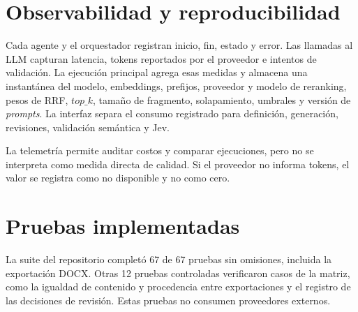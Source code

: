 \section{Observabilidad y reproducibilidad}

Cada agente y el orquestador registran inicio, fin, estado y error. Las llamadas al LLM capturan latencia, tokens reportados por el proveedor e intentos de validación. La ejecución principal agrega esas medidas y almacena una instantánea del modelo, embeddings, prefijos, proveedor y modelo de reranking, pesos de RRF, \(top\_k\), tamaño de fragmento, solapamiento, umbrales y versión de \emph{prompts}. La interfaz separa el consumo registrado para definición, generación, revisiones, validación semántica y Jev.

La telemetría permite auditar costos y comparar ejecuciones, pero no se interpreta como medida directa de calidad. Si el proveedor no informa tokens, el valor se registra como no disponible y no como cero.

\section{Pruebas implementadas}

La suite del repositorio completó 67 de 67 pruebas sin omisiones, incluida la exportación DOCX. Otras 12 pruebas controladas verificaron casos de la matriz, como la igualdad de contenido y procedencia entre exportaciones y el registro de las decisiones de revisión. Estas pruebas no consumen proveedores externos.

